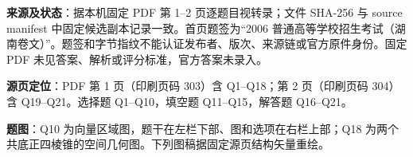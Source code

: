 

\begin{gktip}
\textbf{来源及状态}：据本机固定 PDF 第 1–2 页逐题目视转录；文件 SHA-256 与 source manifest 中固定候选副本记录一致。首页题签为“2006 普通高等学校招生考试（湖南卷文）”。题签和字节指纹不能认证发布者、版次、来源链或官方原件身份。固定 PDF 未见答案、解析或评分标准，官方答案未录入。

\textbf{源页定位}：PDF 第 1 页（印刷页码 303）含 Q1–Q18；第 2 页（印刷页码 304）含 Q19–Q21。选择题 Q1–Q10，填空题 Q11–Q15，解答题 Q16–Q21。

\textbf{题图}：Q10 为向量区域图，题干在左栏下部、图和选项在右栏上部；Q18 为两个共底正四棱锥的空间几何图。下列图稿据固定源页结构矢量重绘。
\end{gktip}


